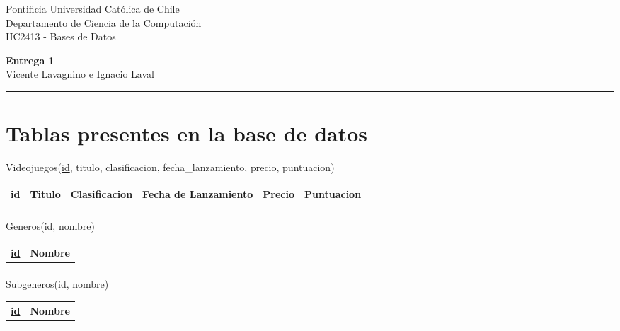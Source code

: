 \documentclass[12pt]{article}
\begin{document}
\thispagestyle{empty}
\noindent Pontificia Universidad Católica de Chile\\
\noindent Departamento de Ciencia de la Computación\\
\noindent IIC2413 - Bases de Datos\\
\begin{center}
{\Huge\bf Entrega 1}\\
\vspace{1em}
\footnotesize{Vicente Lavagnino e Ignacio Laval}\\
\vspace{1em}
\rule{\textwidth}{0.1mm}
\end{center}
\thispagestyle{plain}

\section{Tablas presentes en la base de datos}

\noindent Videojuegos(\underline{id}, titulo, clasificacion, fecha\_lanzamiento, precio, puntuacion)
\begin{table}[h]
    \centering
    \begin{tabular}{|l|l|l|l|l|l|l|}
    \hline
    \underline{id} & Titulo & Clasificacion & Fecha de Lanzamiento & Precio & Puntuacion \\ \hline
       &        &           &                 &        &           \\ \hline
    \end{tabular}
\end{table}

\noindent Generos(\underline{id}, nombre)
\begin{table}[h]
    \centering
    \begin{tabular}{|l|l|}
    \hline
    \underline{id} & Nombre \\ \hline
       &        \\ \hline
    \end{tabular}
\end{table}

\noindent Subgeneros(\underline{id}, nombre)
\begin{table}[h]
    \centering
    \begin{tabular}{|l|l|}
    \hline
    \underline{id} & Nombre \\ \hline
       &        \\ \hline
    \end{tabular}
\end{table}
\end{document}
